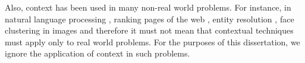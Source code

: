 Also, context has been used in many non-real world problems. For instance, in natural language processing \cite{lee1990context}, ranking pages of the web \cite{page1999pagerank}, entity resolution \cite{chen2009exploiting}, face clustering in images \cite{zhang2013unified} and therefore it must not mean that contextual techniques must apply only to real world problems. For the purposes of this dissertation, we ignore the application of context in such problems.















